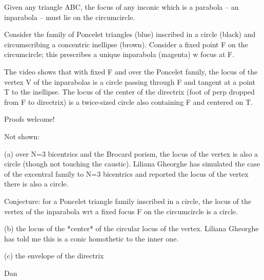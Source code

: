 Given any triangle ABC, the focus of any inconic which is a parabola -- an inparabola -- must lie on the circumcircle.

Consider the family of Poncelet triangles (blue) inscribed in a circle (black) and circumscribing a concentric inellipse (brown).  Consider a fixed point F on the circumcircle; this prescribes a unique inparabola (magenta) w focus at F.

The video shows that with fixed F and over the Poncelet family, the locus of the vertex V of the inparabolas is a circle passing through F and tangent at a point T to the inellipse. The locus of the center of the directrix (foot of perp dropped from F to directrix) is a twice-sized circle also containing F and centered on T.

Proofs welcome!

Not shown:

(a) over N=3 bicentrics and the Brocard porism, the locus of the vertex is also a circle (though not touching the caustic). Liliana Gheorghe has simulated the case of the excentral family to N=3 bicentrics and reported the locus of the vertex there is also a circle.

Conjecture: for a Poncelet triangle family inscribed in a circle, the locus of the vertex of the inparabola wrt a fixed focus F on the circumcircle is a circle.

(b) the locus of the *center* of the circular locus of the vertex. Liliana Gheorghe has told me this is a conic homothetic to the inner one.

(c) the envelope of the directrix

Dan